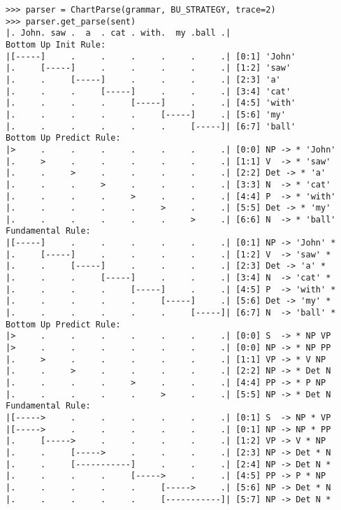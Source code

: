 \documentclass[11pt]{article}
\begin{document}
\begin{figure*}[p]
{\small\begin{verbatim}
>>> parser = ChartParse(grammar, BU_STRATEGY, trace=2)
>>> parser.get_parse(sent)
|. John. saw .  a  . cat . with.  my .ball .|
Bottom Up Init Rule:
|[-----]     .     .     .     .     .     .| [0:1] 'John' 
|.     [-----]     .     .     .     .     .| [1:2] 'saw' 
|.     .     [-----]     .     .     .     .| [2:3] 'a' 
|.     .     .     [-----]     .     .     .| [3:4] 'cat' 
|.     .     .     .     [-----]     .     .| [4:5] 'with' 
|.     .     .     .     .     [-----]     .| [5:6] 'my' 
|.     .     .     .     .     .     [-----]| [6:7] 'ball' 
Bottom Up Predict Rule:
|>     .     .     .     .     .     .     .| [0:0] NP -> * 'John' 
|.     >     .     .     .     .     .     .| [1:1] V  -> * 'saw' 
|.     .     >     .     .     .     .     .| [2:2] Det -> * 'a' 
|.     .     .     >     .     .     .     .| [3:3] N  -> * 'cat' 
|.     .     .     .     >     .     .     .| [4:4] P  -> * 'with' 
|.     .     .     .     .     >     .     .| [5:5] Det -> * 'my' 
|.     .     .     .     .     .     >     .| [6:6] N  -> * 'ball' 
Fundamental Rule:
|[-----]     .     .     .     .     .     .| [0:1] NP -> 'John' * 
|.     [-----]     .     .     .     .     .| [1:2] V  -> 'saw' * 
|.     .     [-----]     .     .     .     .| [2:3] Det -> 'a' * 
|.     .     .     [-----]     .     .     .| [3:4] N  -> 'cat' * 
|.     .     .     .     [-----]     .     .| [4:5] P  -> 'with' * 
|.     .     .     .     .     [-----]     .| [5:6] Det -> 'my' * 
|.     .     .     .     .     .     [-----]| [6:7] N  -> 'ball' * 
Bottom Up Predict Rule:
|>     .     .     .     .     .     .     .| [0:0] S  -> * NP VP 
|>     .     .     .     .     .     .     .| [0:0] NP -> * NP PP 
|.     >     .     .     .     .     .     .| [1:1] VP -> * V NP 
|.     .     >     .     .     .     .     .| [2:2] NP -> * Det N 
|.     .     .     .     >     .     .     .| [4:4] PP -> * P NP 
|.     .     .     .     .     >     .     .| [5:5] NP -> * Det N 
Fundamental Rule:
|[----->     .     .     .     .     .     .| [0:1] S  -> NP * VP 
|[----->     .     .     .     .     .     .| [0:1] NP -> NP * PP 
|.     [----->     .     .     .     .     .| [1:2] VP -> V * NP 
|.     .     [----->     .     .     .     .| [2:3] NP -> Det * N 
|.     .     [-----------]     .     .     .| [2:4] NP -> Det N * 
|.     .     .     .     [----->     .     .| [4:5] PP -> P * NP 
|.     .     .     .     .     [----->     .| [5:6] NP -> Det * N 
|.     .     .     .     .     [-----------]| [5:7] NP -> Det N * 

\end{verbatim}}
\end{figure*}
\end{document}
